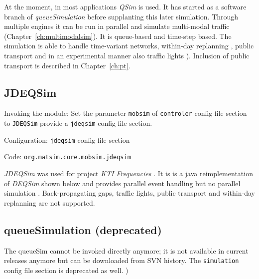 At the moment, in most applications \emph{QSim} \citep[][]{Dobler_TechRep_IVT_2011, Dobler_STRC_2010} is used. It has started as a software branch of \emph{queueSimulation} before supplanting this later simulation. Through multiple engines it can be run in parallel and simulate multi-modal traffic (Chapter~\ref{ch:multimodalsim}). It is queue-based and time-step based. The simulation is able to handle time-variant networks, within-day replanning \citep[][]{Dobler_TechRep_IVT_2009}, public transport \citep[][]{Rieser_PhDThesis_2010} and in an experimental manner also traffic lights \citep[][]{Neumann_MastersThesis_2008}). Inclusion of public transport is described in Chapter~\ref{ch:pt}.

\subsection{JDEQSim}
\label{sec:jdeqsim}
\begin{compactitem}
\item Invoking the module: Set the parameter \lstinline|mobsim| of \lstinline|controler| config file section to \lstinline|JDEQSim| provide a \lstinline|jdeqsim| config file section.
\item Configuration: \lstinline|jdeqsim| config file section
\item Code: \lstinline|org.matsim.core.mobsim.jdeqsim|
\end{compactitem}

\emph{JDEQSim} \citep[][]{WaraichEtAl_TechRep_IVT_2009, WaraichEtAl_STRC_2009} was used for project \emph{KTI Frequencies} \citep[][]{BalmerEtAl_ResRep_datapuls_2010}. It is is a java reimplementation of \emph{DEQSim} shown below \citep[][]{WaraichEtAl_STRC_2009, CharyparEtAl_TRR_2007, CharyparEtAl_TRB_2009} and provides parallel event handling but no parallel simulation \citep[][p.11]{BalmerEtAl_ResRep_datapuls_2010}. Back-propagating gaps, traffic lights, public transport and within-day replanning are not supported.

\subsection{queueSimulation (deprecated)}
\label{sec:queueSimulation}
The queueSim cannot be invoked directly anymore; it is not available in current releases anymore but can be downloaded from SVN history. The \lstinline|simulation| config file section is deprecated as well. )

